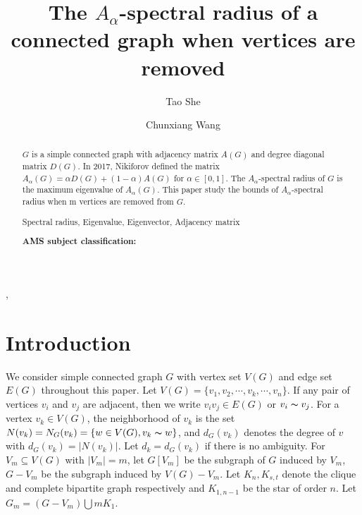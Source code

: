 \documentclass[amsthm]{elsart}
\begin{document}
\begin{frontmatter}
\title{The $A_{\alpha}$-spectral radius of a connected graph when vertices  are removed }

\journal{~~}

\author[CW]{Tao She},
\author[CW]{Chunxiang Wang}



\address[CW]{ School of Mathematics and Statistics, Central China Normal University, Wuhan,  P.R. China}







\begin{abstract}
$G$ is a simple connected graph with adjacency matrix $A(G)$ and degree diagonal matrix $D(G)$.
 In 2017, Nikiforov  \cite{2016Merging} defined the matrix $A_{\alpha}(G) = \alpha D(G) + (1- \alpha)A(G)$ for $\alpha \in [0, 1].$
The $A_\alpha$-spectral radius of $G$ is the maximum eigenvalue of $A_\alpha(G)$.
This paper study the bounds of $A_\alpha$-spectral radius when m vertices are removed from $G$.

\vskip 2mm   Spectral radius,  Eigenvalue,  Eigenvector,  Adjacency matrix

{\bf AMS subject classification:}


\end{abstract}


\end{frontmatter}

\section{Introduction}

\qquad  We consider simple connected graph $G$ with vertex set $V(G)$ and edge set $E(G)$  throughout this paper.   Let $V(G)=\{v_1, v_2, \cdots, v_k, \cdots, v_n\}$. If any pair of vertices $v_i$ and $v_j$ are adjacent, then we write $v_iv_j \in E(G)$ or $v_i \thicksim v_j$. For a vertex $v_k \in V(G)$, the neighborhood of  $v_k $ is the set $N(v_k) = N_G(v_k) = \{w \in V(G),  v_k \thicksim w    \}$, and $d_G(v_k)$  denotes the degree of $v$ with $ d_{G}(v_k) = |N(v_k)|$.  Let $d_k=d_G(v_k)$  if there
is no ambiguity. For $V_m \subseteq V(G)$ with $|V_m|=m$,   let $G[V_m]$ be the subgraph of $G$ induced by $V_m$, $G - V_m$ be the subgraph induced by $V(G) - V_m$. Let $K_n, K_{s,t}$   denote the clique and complete bipartite graph respectively and  $K_{1,n-1}$ be the star of order $n$. Let $G_m =(G - V_m)  \bigcup m K_1$.
\end{document}
